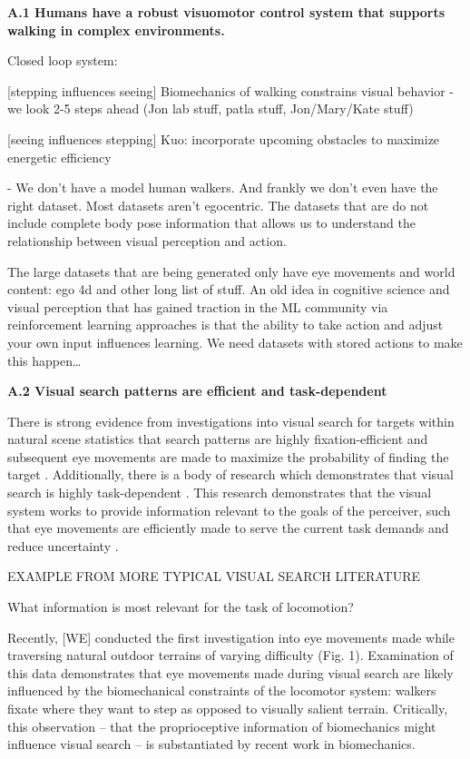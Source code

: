 
\textbf{A.1 Humans have a robust visuomotor control system that supports walking in complex environments.}

Closed loop system:

[stepping influences seeing] Biomechanics of walking constrains visual behavior 
- we look 2-5 steps ahead (Jon lab stuff, patla stuff, Jon/Mary/Kate stuff)

[seeing influences stepping] 
Kuo: incorporate upcoming obstacles to maximize energetic efficiency

- We don't have a model human walkers. And frankly we don't even have the right dataset.  Most datasets aren't egocentric.  The datasets that are do not include complete body pose information that allows us to understand the relationship between visual perception and action.

The large datasets that are being generated only have eye movements and
world content: ego 4d and other long list of stuff. An old idea in
cognitive science and visual perception that has gained traction in the
ML community via reinforcement learning approaches is that the ability
to take action and adjust your own input influences learning. We need
datasets with stored actions to make this happen\ldots{}\newline


\noindent \textbf{A.2 Visual search patterns are efficient and task-dependent}

\noindent There is strong evidence from investigations into visual search for targets within natural scene statistics that search patterns are highly fixation-efficient and subsequent eye movements are made to maximize the probability of finding the target \cite{najemnik_optimal_2005}. Additionally, there is a body of research which demonstrates that visual search is highly task-dependent \cite{jovancevic-misic2009, tong2017, zhang2018, hayhoe2005, tatler2011, rothkopf2016}. This research demonstrates that the visual system works to provide information relevant to the goals of the perceiver, such that eye movements are efficiently made to serve the current task demands and reduce uncertainty \cite{Matthis2018}. 

EXAMPLE FROM MORE TYPICAL VISUAL SEARCH LITERATURE

What information is most relevant for the task of locomotion?

Recently, [WE] conducted the first investigation into eye movements made while traversing natural outdoor terrains of varying difficulty \cite{Matthis2018,hayhoe2018} (Fig. 1). Examination of this data demonstrates that eye movements made during visual search are likely influenced by the biomechanical constraints of the locomotor system: walkers fixate where they want to step as opposed to visually salient terrain. Critically, this observation – that the proprioceptive information of biomechanics might influence visual search – is substantiated by recent work in biomechanics.

